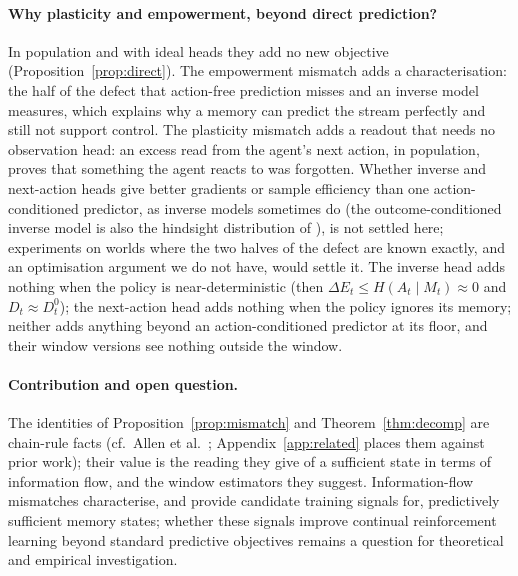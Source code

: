 \documentclass[11pt]{article}
\theoremstyle{plain}
\theoremstyle{definition}
\theoremstyle{remark}
\newcommand{\dE}{\Delta E}
\begin{document}
\paragraph{Why plasticity and empowerment, beyond direct prediction?}
In population and with ideal heads they add no new objective (Proposition~\ref{prop:direct}). The empowerment mismatch adds a characterisation: the half of the defect that action-free prediction misses and an inverse model measures, which explains why a memory can predict the stream perfectly and still not support control. The plasticity mismatch adds a readout that needs no observation head: an excess read from the agent's next action, in population, proves that something the agent reacts to was forgotten. Whether inverse and next-action heads give better gradients or sample efficiency than one action-conditioned predictor, as inverse models sometimes do \cite{pathak2017curiosity, allen2021learning} (the outcome-conditioned inverse model is also the hindsight distribution of \cite{harutyunyan2019hindsight}), is not settled here; experiments on worlds where the two halves of the defect are known exactly, and an optimisation argument we do not have, would settle it. The inverse head adds nothing when the policy is near-deterministic (then $\dE_t \le H(A_t \mid M_t) \approx 0$ and $D_t \approx D^0_t$); the next-action head adds nothing when the policy ignores its memory; neither adds anything beyond an action-conditioned predictor at its floor, and their window versions see nothing outside the window.

\paragraph{Contribution and open question.}
The identities of Proposition~\ref{prop:mismatch} and Theorem~\ref{thm:decomp} are chain-rule facts (cf.\ Allen et al.\ \cite{allen2021learning}; Appendix~\ref{app:related} places them against prior work); their value is the reading they give of a sufficient state in terms of information flow, and the window estimators they suggest. Information-flow mismatches characterise, and provide candidate training signals for, predictively sufficient memory states; whether these signals improve continual reinforcement learning beyond standard predictive objectives remains a question for theoretical and empirical investigation.




\appendix
\end{document}
